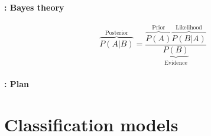 \documentclass[xcolor=table]{beamer}
\subtitle[Naïve Bayes \& HMM]{Naïve Bayes and Hidden Markov Model}
\begin{document}
\begin{frame}
	\frametitle{\inserttitle}
	\framesubtitle{\insertshortsubtitle: Bayes theory}
	\huge
	\[
	\overbrace{P(A|B)}^\text{Posterior} = \frac{\overbrace{P(A)}^\text{Prior} \overbrace{P(B|A)}^{\text{Likelihood}}}{\underbrace{P(B)}_\text{Evidence}}
	\]
\end{frame}

\begin{frame}
	\frametitle{\inserttitle}
	\framesubtitle{\insertshortsubtitle: Plan}

	\begin{multicols}{2}
		\tableofcontents
	\end{multicols}
\end{frame}

\section{Classification models}
\end{document}
